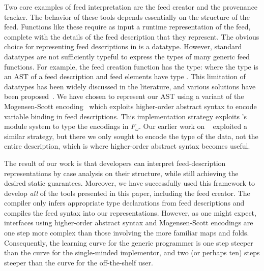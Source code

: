 Two core examples of feed interpretation are the feed creator and the
provenance tracker. The behavior of these tools depends
essentially on the structure of the feed.  Functions like these
require as input a runtime representation of the feed,
complete with the details of the feed description that
they represent. The obvious choice for representing feed descriptions
in \ocaml is a datatype. However, standard \ocaml datatypes are not
sufficiently typeful to express the types of many generic feed
functions. For example, the feed creation function has the type:
 
where the type  is an AST of a feed description and feed 
elements have type .
%
%
This limitation of datatypes has been widely discussed in the
literature, and various solutions have been 
proposed~\cite{padsml-padl,weirich:encodingtypecase,xi:popl03,yang:icfp98}. We have 
chosen to represent our AST using a variant of the Mogensen-Scott
encoding~\cite{mogensen:jfp,wand98} which exploits higher-order abstract syntax 
to encode variable binding in feed descriptions.  This implementation strategy 
exploits \ocaml's module system to type the encodings in $F_\omega$. 
Our earlier work on \padsml~\cite{padsml-padl} 
exploited a similar strategy,
but there we only sought to encode the \ocaml{} type of the data, not
the entire \padsml{} description, which is where higher-order abstract
syntax becomes useful.


The result of our work is that developers
can interpret feed-description representations by case analysis on
their structure, while still achieving the desired static
guarantees. Moreover, we have successfully used this framework to
develop {\it all} of the tools presented in this paper, including the
feed creator. The compiler only infers appropriate
type declarations from feed descriptions and compiles the feed syntax
into our representations.  However, as one might expect, interfaces using
higher-order abstract syntax and Mogensen-Scott encodings are one step more
complex than those involving the more familiar maps and folds.  Consequently, the
learning curve for the generic programmer is one step steeper than
the curve for the single-minded implementor, and two (or perhaps ten) steps steeper
than the curve for the off-the-shelf user.

